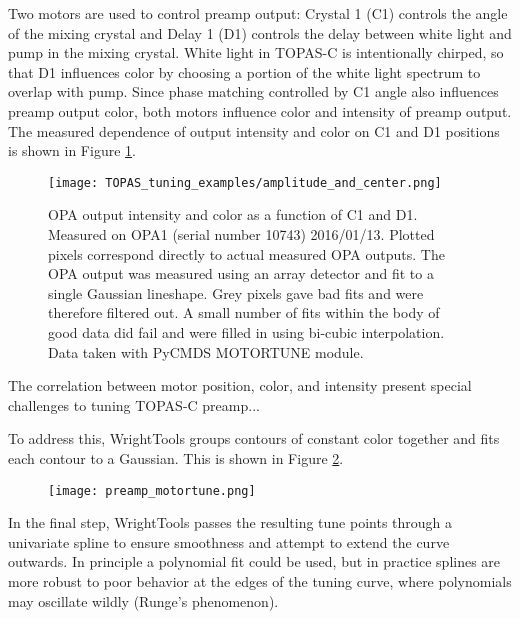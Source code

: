 Two motors are used to control preamp output: Crystal 1 (C1) controls the angle of the mixing crystal and Delay 1 (D1) controls the delay between white light and pump in the mixing crystal. White light in TOPAS-C is intentionally chirped, so that D1 influences color by choosing a portion of the white light spectrum to overlap with pump. Since phase matching controlled by C1 angle also influences preamp output color, both motors influence color and intensity of preamp output. The measured dependence of output intensity and color on C1 and D1 positions is shown in Figure \ref{fig:TOPAS amplitude and center}.

\begin{figure}
	\begin{centering}
		\texttt{[image: TOPAS\_tuning\_examples/amplitude\_and\_center.png]}
		\caption{OPA output intensity and color as a function of C1 and D1. Measured on OPA1 (serial number 10743) 2016/01/13. Plotted pixels correspond directly to actual measured OPA outputs. The OPA output was measured using an array detector and fit to a single Gaussian lineshape. Grey pixels gave bad fits and were therefore filtered out. A small number of fits within the body of good data did fail and were filled in using bi-cubic interpolation. Data taken with PyCMDS MOTORTUNE module.}
	\end{centering}
	\label{fig:TOPAS amplitude and center}
\end{figure}

The correlation between motor position, color, and intensity present special challenges to tuning TOPAS-C preamp...

To address this, WrightTools groups contours of constant color together and fits each contour to a Gaussian. This is shown in Figure \ref{fig:TOPAS contour fit}.

\begin{figure}
	\begin{centering}
		\texttt{[image: preamp\_motortune.png]}
		\caption{}
	\end{centering}
	\label{fig:TOPAS contour fit}
\end{figure}

In the final step, WrightTools passes the resulting tune points through a univariate spline to ensure smoothness and attempt to extend the curve outwards. In principle a polynomial fit could be used, but in practice splines are more robust to poor behavior at the edges of the tuning curve, where polynomials may oscillate wildly (Runge's phenomenon).

